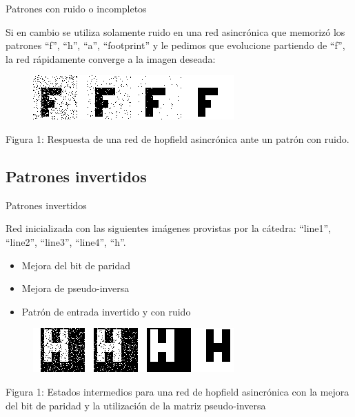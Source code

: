 \documentclass{beamer}
\begin{document}
\begin{frame}{Patrones con ruido o incompletos}

\par Si en cambio se utiliza solamente ruido en una red asincrónica que memorizó los patrones ``f'', ``h'', ``a'', ``footprint'' y le pedimos que evolucione partiendo de ``f'', la red rápidamente converge a la imagen deseada:

\begin{figure}[H]
\begin{center}
\includegraphics[scale=0.75]{./images/noisyf.png}
\label{modelado}
\end{center}
\end{figure}

\begin{center}
\par Figura 1: Respuesta de una red de hopfield asincrónica ante un patrón con ruido.
\end{center}

\end{frame}

\subsection{Patrones invertidos}

\begin{frame}{Patrones invertidos}

\par Red inicializada con las siguientes imágenes provistas por la cátedra: ``line1'', ``line2'', ``line3'', ``line4'', ``h''.\\

\begin{itemize}
\item Mejora del bit de paridad
\item Mejora de pseudo-inversa
\item Patrón de entrada invertido y con ruido
\end{itemize}

\begin{figure}[H]
\begin{center}
\includegraphics[scale=0.55]{./images/hinvypar.png}
\label{modelado}
\end{center}
\end{figure}

\begin{center}
\par Figura 1: Estados intermedios para una red de hopfield asincrónica con la mejora del bit de paridad y la utilización de la matriz pseudo-inversa
\end{center}
\end{frame}
\end{document}
